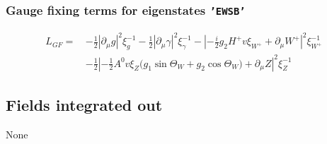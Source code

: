 \subsubsection{Gauge fixing terms for eigenstates {\tt 'EWSB'} } 
\begin{align} 
L_{GF} = \, &-\frac{1}{2} |\partial_{\mu}g|^2 \xi_{g}^{-1} -\frac{1}{2} |\partial_{\mu}\gamma|^2 \xi_{\gamma}^{-1} - |-\frac{i}{2} g_2 H^+ v \xi_{W^+}  + \partial_{\mu}W^+|^2 \xi_{W^+}^{-1} \nonumber \\ 
 &-\frac{1}{2} |-\frac{1}{2} A^0 v \xi_{Z} \Big(g_1 \sin\Theta_W   + g_2 \cos\Theta_W  \Big) + \partial_{\mu}Z|^2 \xi_{Z}^{-1} 
\end{align} 
\subsection{Fields integrated out} 
None 
